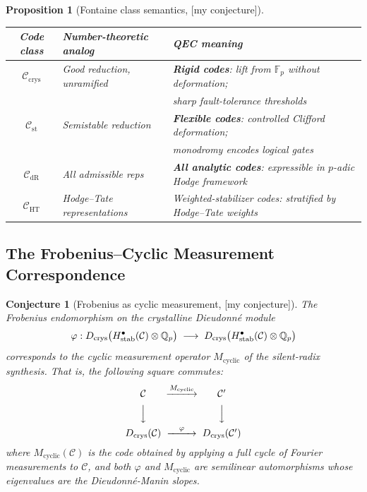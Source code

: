\documentclass[12pt]{article}
\theoremstyle{definition}
\theoremstyle{plain}
\newtheorem{conjecture}{Conjecture}[section]
\newtheorem{proposition}{Proposition}[section]
\theoremstyle{remark}
\newcommand{\myconj}{{\color{orange}[\textsf{my conjecture}]}}
\newcommand{\Fp}{\mathbb{F}_p}
\newcommand{\Qp}{\mathbb{Q}_p}
\newcommand{\cC}{\mathcal{C}}
\begin{document}
\begin{proposition}[Fontaine class semantics, \myconj]\label{prop:fontaine-semantics}
\begin{center}
\begin{tabular}{c|p{3.5cm}|p{6.5cm}}
Code class & Number-theoretic analog & QEC meaning\\\hline
$\cC_{\mathrm{crys}}$ & Good reduction, unramified & \textbf{Rigid codes}: lift from $\Fp$ without deformation;\\
 &  & sharp fault-tolerance thresholds\\
$\cC_{\mathrm{st}}$ & Semistable reduction & \textbf{Flexible codes}: controlled Clifford deformation;\\
 &  & monodromy encodes logical gates\\
$\cC_{\mathrm{dR}}$ & All admissible reps & \textbf{All analytic codes}: expressible in $p$-adic Hodge framework\\
$\cC_{\mathrm{HT}}$ & Hodge--Tate representations & Weighted-stabilizer codes: stratified by Hodge--Tate weights
\end{tabular}
\end{center}
\end{proposition}

\subsection{The Frobenius--Cyclic Measurement Correspondence}

\begin{conjecture}[Frobenius as cyclic measurement, \myconj]\label{conj:F-cyclic}
The Frobenius endomorphism on the crystalline Dieudonn\'{e} module
\[
\varphi: D_{\mathrm{crys}}\bigl(H^{\bullet}_{\textup{stab}}(\cC)\otimes\Qp\bigr)
\;\longrightarrow\;
D_{\mathrm{crys}}\bigl(H^{\bullet}_{\textup{stab}}(\cC)\otimes\Qp\bigr)
\]
corresponds to the \emph{cyclic measurement operator} $M_{\mathrm{cyclic}}$ of the silent-radix synthesis. That is, the following square commutes:
\[
\begin{CD}
\cC          @>{M_{\mathrm{cyclic}}}>> \cC'\\
@VVV                             @VVV\\
D_{\mathrm{crys}}(\cC) @>{\varphi}>> D_{\mathrm{crys}}(\cC')
\end{CD}
\]
where $M_{\mathrm{cyclic}}(\cC)$ is the code obtained by applying a full cycle of Fourier measurements to $\cC$, and both $\varphi$ and $M_{\mathrm{cyclic}}$ are semilinear automorphisms whose eigenvalues are the Dieudonn\'{e}-Manin slopes.
\end{conjecture}
\end{document}
